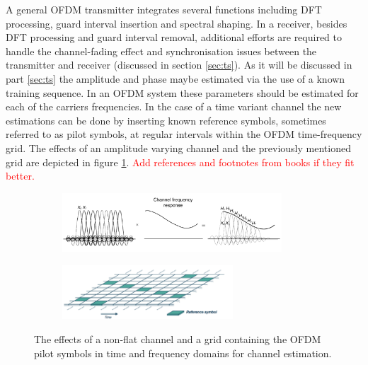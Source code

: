 \documentclass[12pt,a4paper,openright]{report}
\begin{document}
A general OFDM transmitter integrates several functions including DFT processing, guard interval insertion and spectral shaping. In a receiver, besides DFT processing and guard interval removal, additional efforts are required to handle the channel-fading effect and synchronisation issues between the transmitter and receiver (discussed in section \ref{sec:ts}).
As it will be discussed in part \ref{sec:ts} the amplitude and phase maybe estimated via the use of a known training sequence. In an OFDM system these parameters should be estimated for each of the carriers frequencies. In the case of a time variant channel the new estimations can be done by inserting known reference symbols, sometimes referred to as pilot symbols, at regular intervals within the OFDM time-frequency grid. The effects of an amplitude varying channel and the previously mentioned grid are depicted in figure \ref{fig:ofdmchannel}.
\textcolor{red}{Add references and footnotes from books if they fit better.}
\begin{figure}[H]
 \centering
	\begin{subfigure}[H]{0.9\textwidth}
 	\centering
    \includegraphics[width=0.9\textwidth]{ofdmchannel.pdf}

	\end{subfigure}
	
	\begin{subfigure}[H]{0.9\textwidth}
 	\centering
    \includegraphics[width=0.7\textwidth]{ofdmgrid.pdf}
 	\end{subfigure}
    \caption[The effects of a non-flat channel and a grid containing the OFDM pilot symbols]{The effects of a non-flat channel and a grid containing the OFDM pilot symbols in time and frequency domains for channel estimation.}
    \label{fig:ofdmchannel}
\end{figure}
\end{document}
